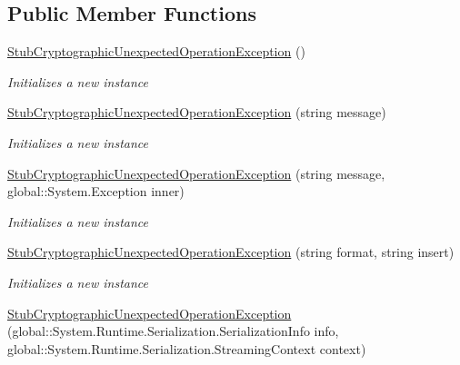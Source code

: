 \subsection*{Public Member Functions}
\begin{DoxyCompactItemize}
\item 
\hyperlink{class_system_1_1_security_1_1_cryptography_1_1_fakes_1_1_stub_cryptographic_unexpected_operation_exception_aba8c201a9164473e3b2e494fbc03fa11}{Stub\-Cryptographic\-Unexpected\-Operation\-Exception} ()
\begin{DoxyCompactList}\small\item\em Initializes a new instance\end{DoxyCompactList}\item 
\hyperlink{class_system_1_1_security_1_1_cryptography_1_1_fakes_1_1_stub_cryptographic_unexpected_operation_exception_a603201a84ac995ef516399a067cd2c84}{Stub\-Cryptographic\-Unexpected\-Operation\-Exception} (string message)
\begin{DoxyCompactList}\small\item\em Initializes a new instance\end{DoxyCompactList}\item 
\hyperlink{class_system_1_1_security_1_1_cryptography_1_1_fakes_1_1_stub_cryptographic_unexpected_operation_exception_a420a73c3fd13dc95ce7120d2628c29b7}{Stub\-Cryptographic\-Unexpected\-Operation\-Exception} (string message, global\-::\-System.\-Exception inner)
\begin{DoxyCompactList}\small\item\em Initializes a new instance\end{DoxyCompactList}\item 
\hyperlink{class_system_1_1_security_1_1_cryptography_1_1_fakes_1_1_stub_cryptographic_unexpected_operation_exception_a8a7516eb1e49bc1c596175569e18d6fa}{Stub\-Cryptographic\-Unexpected\-Operation\-Exception} (string format, string insert)
\begin{DoxyCompactList}\small\item\em Initializes a new instance\end{DoxyCompactList}\item 
\hyperlink{class_system_1_1_security_1_1_cryptography_1_1_fakes_1_1_stub_cryptographic_unexpected_operation_exception_ae6ea77fe55b690644b5adcdf46b2838b}{Stub\-Cryptographic\-Unexpected\-Operation\-Exception} (global\-::\-System.\-Runtime.\-Serialization.\-Serialization\-Info info, global\-::\-System.\-Runtime.\-Serialization.\-Streaming\-Context context)

\end{DoxyCompactItemize}
